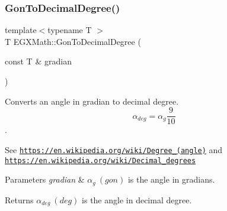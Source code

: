 \subsubsection{\texorpdfstring{Gon\+To\+Decimal\+Degree()}{GonToDecimalDegree()}}
{\footnotesize\ttfamily template$<$typename T $>$ \\
T E\+G\+X\+Math\+::\+Gon\+To\+Decimal\+Degree (\begin{DoxyParamCaption}\item[{const T \&}]{gradian }\end{DoxyParamCaption})}



Converts an angle in gradian to decimal degree. \[\alpha_{deg}=\alpha_{g}\frac{9}{10}\]. 

See \href{https://en.wikipedia.org/wiki/Degree_(angle)}{\tt https\+://en.\+wikipedia.\+org/wiki/\+Degree\+\_\+(angle)} and \href{https://en.wikipedia.org/wiki/Decimal_degrees}{\tt https\+://en.\+wikipedia.\+org/wiki/\+Decimal\+\_\+degrees} 
\begin{DoxyParams}{Parameters}
{\em gradian} & $\alpha_{g}\ (gon)$ is the angle in gradians. \\
\hline
\end{DoxyParams}
\begin{DoxyReturn}{Returns}
$\alpha_{deg}\ (deg)$ is the angle in decimal degree. 
\end{DoxyReturn}
